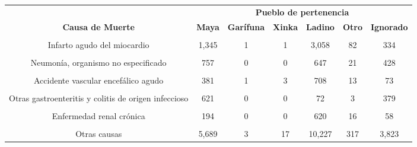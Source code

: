 \begin{tabular}[t]{ccccccc}
\toprule
\multicolumn{1}{c}{\textbf{ }} & \multicolumn{6}{c}{\textbf{Pueblo de pertenencia}} \\
\cmidrule(l{3pt}r{3pt}){2-7}
\textbf{Causa de Muerte} & \textbf{Maya} & \textbf{Garífuna} & \textbf{Xinka} & \textbf{Ladino} & \textbf{Otro} & \textbf{Ignorado}\\
\midrule
\cellcolor[HTML]{B6B3FF}{SARS-CoV2/COVID-19} & \cellcolor[HTML]{B6B3FF}{1,048} & \cellcolor[HTML]{B6B3FF}{4} & \cellcolor[HTML]{B6B3FF}{4} & \cellcolor[HTML]{B6B3FF}{4,107} & \cellcolor[HTML]{B6B3FF}{91} & \cellcolor[HTML]{B6B3FF}{352}\\
Infarto agudo del miocardio & 1,345 & 1 & 1 & 3,058 & 82 & 334\\
\cellcolor[HTML]{B6B3FF}{Diabetes mellitus, no especificada} & \cellcolor[HTML]{B6B3FF}{1,494} & \cellcolor[HTML]{B6B3FF}{2} & \cellcolor[HTML]{B6B3FF}{7} & \cellcolor[HTML]{B6B3FF}{2,785} & \cellcolor[HTML]{B6B3FF}{51} & \cellcolor[HTML]{B6B3FF}{232}\\
Neumonía, organismo no especificado & 757 & 0 & 0 & 647 & 21 & 428\\
\cellcolor[HTML]{B6B3FF}{Diabetes mellitus no insulinodependiente} & \cellcolor[HTML]{B6B3FF}{666} & \cellcolor[HTML]{B6B3FF}{1} & \cellcolor[HTML]{B6B3FF}{1} & \cellcolor[HTML]{B6B3FF}{1,051} & \cellcolor[HTML]{B6B3FF}{22} & \cellcolor[HTML]{B6B3FF}{90}\\
Accidente vascular encefálico agudo & 381 & 1 & 3 & 708 & 13 & 73\\
\cellcolor[HTML]{B6B3FF}{Fibrosis y cirrosis del hígado} & \cellcolor[HTML]{B6B3FF}{396} & \cellcolor[HTML]{B6B3FF}{0} & \cellcolor[HTML]{B6B3FF}{2} & \cellcolor[HTML]{B6B3FF}{617} & \cellcolor[HTML]{B6B3FF}{16} & \cellcolor[HTML]{B6B3FF}{57}\\
Otras gastroenteritis y colitis de origen infeccioso & 621 & 0 & 0 & 72 & 3 & 379\\
\cellcolor[HTML]{B6B3FF}{Tumor maligno del hígado y de las vías biliares intrahepáticas} & \cellcolor[HTML]{B6B3FF}{266} & \cellcolor[HTML]{B6B3FF}{0} & \cellcolor[HTML]{B6B3FF}{3} & \cellcolor[HTML]{B6B3FF}{576} & \cellcolor[HTML]{B6B3FF}{12} & \cellcolor[HTML]{B6B3FF}{51}\\
Enfermedad renal crónica & 194 & 0 & 0 & 620 & 16 & 58\\
\cellcolor[HTML]{B6B3FF}{Síntomas, signos y hallazgos anormales clínicos y de laboratorio} & \cellcolor[HTML]{B6B3FF}{2,862} & \cellcolor[HTML]{B6B3FF}{2} & \cellcolor[HTML]{B6B3FF}{7} & \cellcolor[HTML]{B6B3FF}{3,742} & \cellcolor[HTML]{B6B3FF}{116} & \cellcolor[HTML]{B6B3FF}{889}\\
Otras causas & 5,689 & 3 & 17 & 10,227 & 317 & 3,823\\
\bottomrule
\end{tabular}
